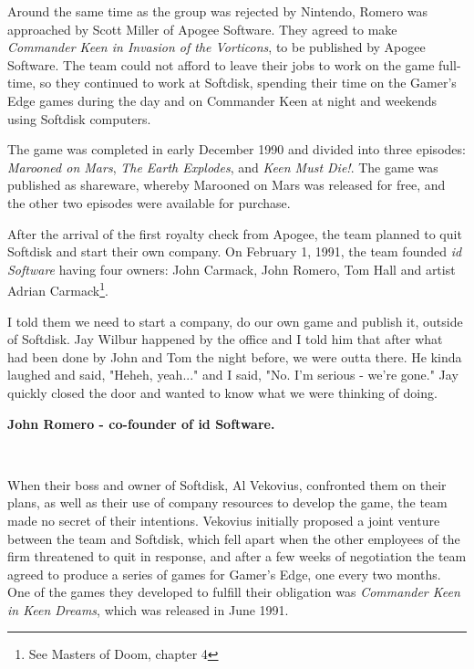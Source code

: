 \documentclass[book.tex]{subfiles}
\begin{document}
\label{sec:id_software}
Around the same time as the group was rejected by Nintendo, Romero was approached by Scott Miller of Apogee Software. They agreed to make \textit{Commander Keen in Invasion of the Vorticons}, to be published by Apogee Software. The team could not afford to leave their jobs to work on the game full-time, so they continued to work at Softdisk, spending their time on the Gamer's Edge games during the day and on Commander Keen at night and weekends using Softdisk computers.\\

\par
The game was completed in early December 1990 and divided into three episodes: \textit{Marooned on Mars}, \textit{The Earth Explodes}, and \textit{Keen Must Die!}. The game was published as shareware, whereby Marooned on Mars was released for free, and the other two episodes were available for purchase.\\

\par
After the arrival of the first royalty check from Apogee, the team planned to quit Softdisk and start their own company. On February 1, 1991, the team founded \textit{id Software} having four owners: John Carmack, John Romero, Tom Hall and artist Adrian Carmack\footnote{See Masters of Doom, chapter 4}. \\

\par
\begin{fancyquotes}
I told them we need to start a company, do our own game and publish it, outside of Softdisk. Jay Wilbur happened by the office and I told him that after what had been done by John and Tom the night before, we were outta there. He kinda laughed and said, "Heheh, yeah..." and I said, "No. I'm serious - we're gone." Jay quickly closed the door and wanted to know what we were thinking of doing.\\
\par
\textbf{John Romero - co-founder of id Software.}
\end{fancyquotes}\\

\bigskip
\par
When their boss and owner of Softdisk, Al Vekovius, confronted them on their plans, as well as their use of company resources to develop the game, the team made no secret of their intentions. Vekovius initially proposed a joint venture between the team and Softdisk, which fell apart when the other employees of the firm threatened to quit in response, and after a few weeks of negotiation the team agreed to produce a series of games for Gamer's Edge, one every two months. One of the games they developed to fulfill their obligation was \textit{Commander Keen in Keen Dreams}, which was released in June 1991.\\
\end{document}
